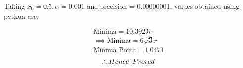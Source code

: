 \documentclass[10pt, a4paper]{article}
\begin{document}
Taking $x_0=0.5,\alpha=0.001$ and precision = 0.00000001, values obtained using python are:
    

    \begin{align}
        \text{Minima} = 10.3923r\\
        \implies \boxed{\text{Minima} = 6\sqrt{3}r}\\
        \boxed{\text{Minima Point} = 1.0471}
    \end{align}
    \begin{align*}
    \therefore  Hence\hspace{0.5em}Proved 
    \end{align*} 
   
\end{document}
